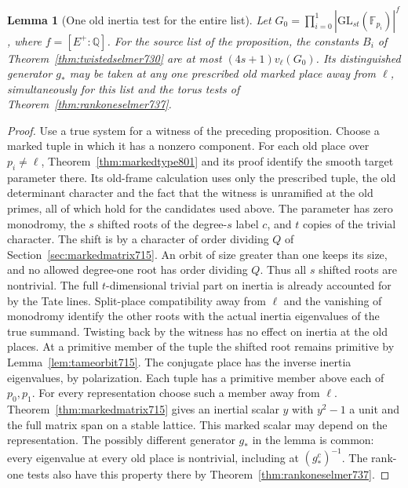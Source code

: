 \documentclass[a4paper,11pt]{article}
\newtheorem{lemma}[proposition]{Lemma}
\theoremstyle{definition}
\theoremstyle{remark}
\numberwithin{equation}{section}
\begin{document}
\begin{lemma}[One old inertia test for the entire list]
\leavevmode\label{lem:sourcebudget803}
Let \(G_0=\prod_{i=0}^1|\mathrm{GL}_{st}(\mathbb F_{p_i})|^{f}\),
where \(f=[E^+:\mathbb Q]\). For the source list of the proposition,
the constants \(B_i\) of Theorem~\ref{thm:twistedselmer730} are
at most \((4s+1)v_\ell(G_0)\). Its distinguished generator \(g_*\)
may be taken at any one prescribed old marked place away from
\(\ell\), simultaneously for this list and the torus tests of
Theorem~\ref{thm:rankoneselmer737}.
\end{lemma}
\begin{proof}
Use a true system for a witness of the preceding proposition.
Choose a marked tuple in which it has a nonzero component.
For each old place over \(p_i\ne\ell\),
Theorem~\ref{thm:markedtype801} and its proof identify
the smooth target parameter there. Its old-frame calculation uses
only the prescribed tuple, the old determinant character and the
fact that the witness is unramified at the old primes, all of
which hold for the candidates used above. The parameter has zero monodromy, the
\(s\) shifted roots of the degree-\(s\) label \(c\), and \(t\)
copies of the trivial character. The shift is by a character
of order dividing \(Q\) of Section~\ref{sec:markedmatrix715}.
An orbit of size greater than one keeps its size, and no allowed
degree-one root has order dividing \(Q\). Thus all \(s\) shifted
roots are nontrivial. The full \(t\)-dimensional trivial part
on inertia is already accounted for by the Tate lines.
Split-place compatibility away from \(\ell\) and the vanishing
of monodromy identify the other roots with the actual inertia
eigenvalues of the true summand. Twisting back by the witness
has no effect on inertia at the old places. At a primitive
member of the tuple the shifted root remains primitive by
Lemma~\ref{lem:tameorbit715}.
The conjugate place has the inverse inertia eigenvalues, by
polarization. Each tuple has a primitive member above each
of \(p_0,p_1\). For every representation choose such a member
away from \(\ell\). Theorem~\ref{thm:markedmatrix715} gives an
inertial scalar \(y\) with \(y^2-1\) a unit and the full matrix
span on a stable lattice. This marked scalar may depend on
the representation. The possibly different generator \(g_*\)
in the lemma is common: every eigenvalue at every old place
is nontrivial, including at \((g_*^c)^{-1}\). The rank-one tests
also have this property there by Theorem~\ref{thm:rankoneselmer737}.


\end{proof}
\end{document}
